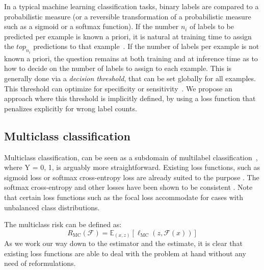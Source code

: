 In a typical machine learning classification tasks, binary labels are compared to a probabilistic measure (or a reversible
transformation of a probabilistic measure such as a sigmoid or a softmax
function). If the number $n_i$ of labels to be predicted per
example is known a priori, it is natural at training time to assign the $top_{n_i}$ predictions
to that example~\cite{lossTopKError, topKmulticlassSVM}. If the number of
labels per example is not known a priori, the question remains at both training and at inference time
as to how to decide on the number of labels to assign to each
example. This is generally done via a \emph{decision threshold}, that can be set globally for all
examples. This threshold can optimize for specificity or
sensitivity~\cite{decisionThreshold}. We propose an approach where this threshold
is implicitly defined, by using a loss function that penalizes explicitly for wrong label counts.



\subsection{Multiclass classification}
\label{section:background:multiclassClassification}

Multiclass classification, can be seen as a subdomain of multilabel classification~\citep{multilabelReduction}, where Y = {0, 1}, is arguably more straightforward. Existing loss functions, such as sigmoid loss or softmax cross-entropy loss are already suited to the purpose . The softmax cross-entropy and other losses have been shown to be consistent \cite{consistency-multiclassSVM, consistency-lossAnalysis, consistency-surrogates}. Note that certain loss functions such as the focal loss accommodate for cases with unbalanced class distributions. 

The multiclass risk can be defined as:
%
\begin{equation}
R_{\mathrm{MC}}(\mathcal{F}) = \mathbb{E}_{(x, z)}\left[\ell_{\mathrm{MC}}(z, \mathcal{F}(x))\right]
\end{equation}
%
As we work our way down to the estimator and the estimate, it is clear that existing loss functions are able to deal with the problem at hand without any need of reformulations. 

\cite{multiclassToBinary1}



